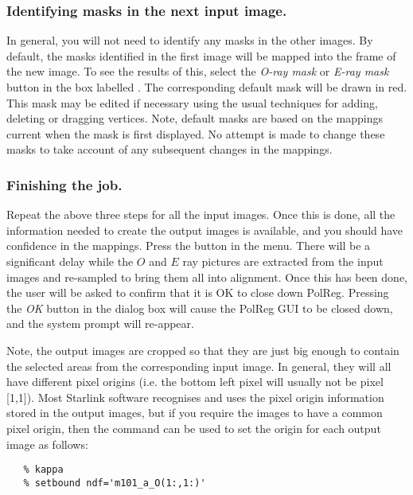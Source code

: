 \subsubsection {Identifying masks in the next input image.}
In general, you will not need to identify any masks in the other images.
By default, the masks identified in the first image will be mapped into
the frame of the new image. To see the results of this, select the {\em
O-ray mask} or {\em E-ray mask} button in the box labelled 
. The corresponding default mask
will be drawn in red. This mask may be edited if necessary using the
usual techniques for adding, deleting or dragging vertices. Note, 
default masks are based on the mappings current when the mask
is first displayed. No attempt is made to change these masks to take
account of any subsequent changes in the mappings.

\subsubsection {Finishing the job.}
Repeat the above three steps for all the input images. Once this is done,
all the information needed to create the output images is available, and
you should have confidence in the mappings. Press the  button in the 
menu. There will be a significant delay while the $O$ and $E$ ray
pictures are extracted from the input images and re-sampled to bring them
all into alignment. Once this has been done, the user will be asked to
confirm that it is OK to close down PolReg. Pressing the {\em OK} button
in the dialog box will cause the PolReg GUI to be closed down, and the 
system prompt will re-appear.

Note, the output images are cropped so that they are just big enough to
contain the selected areas from the corresponding input image. In
general, they will all have different pixel origins (i.e. the bottom left
pixel will usually not be pixel [1,1]). Most Starlink software recognises
and uses the pixel origin information stored in the output images, but if
you require the images to have a common pixel origin, then the
 command 
can be used to set the origin for each output image as follows:

\begin{verbatim}
   % kappa
   % setbound ndf='m101_a_O(1:,1:)' 
\end{verbatim}


